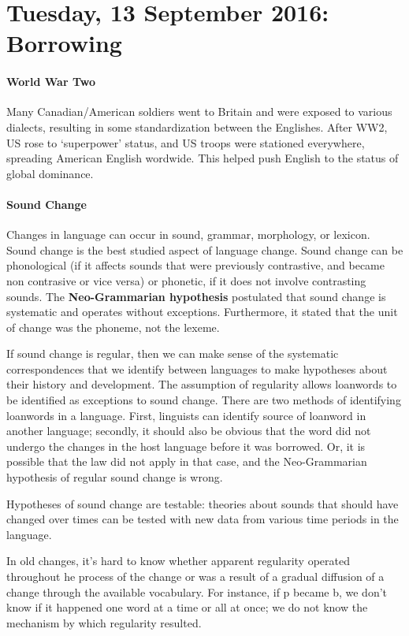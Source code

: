 \documentclass{exam}
\begin{document}
 
\section* {Tuesday, 13 September 2016: Borrowing}


\paragraph{World War Two} Many Canadian/American soldiers went to Britain and were exposed to various dialects, resulting in some standardization between the Englishes. After WW2, US rose to `superpower' status, and US troops were stationed everywhere, spreading American English wordwide. This helped push English to the status of global dominance. 

\paragraph{Sound Change} Changes in language can occur in sound, grammar, morphology, or lexicon. Sound change is the best studied aspect of language change. Sound change can be phonological (if it affects sounds that were previously contrastive, and became non contrasive or vice versa) or phonetic, if it does not involve contrasting sounds. The \textbf{Neo-Grammarian hypothesis} postulated that sound change is systematic and operates without exceptions. Furthermore, it stated that the unit of change was the phoneme, not the lexeme. 

If sound change is regular, then we can make sense of the systematic correspondences that we identify between languages to make hypotheses about their history and development. The assumption of regularity allows loanwords to be identified as exceptions to sound change. There are two methods of identifying loanwords in a language. First, linguists can identify source of loanword in another language; secondly, it should also be obvious that the word did not undergo the changes in the host language before it was borrowed. Or, it is possible that the law did not apply in that case, and the Neo-Grammarian hypothesis of regular sound change is wrong. 

Hypotheses of sound change are testable: theories about sounds that should have changed over times can be tested with new data from various time periods in the language. 

In old changes, it's hard to know whether apparent regularity operated throughout he process of the change or was a result of a gradual diffusion of a change through the available vocabulary. For instance, if p became b, we don't know if it happened one word at a time or all at once; we do not know the mechanism by which regularity resulted. 
\end{document}
